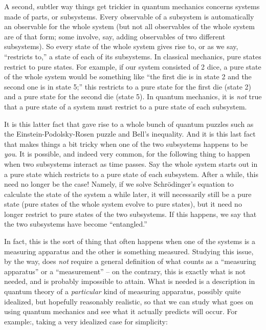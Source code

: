 \documentclass{article}
\begin{document}
A second, subtler way things get trickier in quantum mechanics concerns
systems made of parts, or subsystems. Every observable of a subsystem is
automatically an observable for the whole system (but not all
observables of the whole system are of that form; some involve, say,
adding observables of two different subsystems). So every state of the
whole system gives rise to, or as we say, ``restricts to,'' a state of
each of its subsystems. In classical mechanics, pure states restrict to
pure states. For example, if our system consisted of 2 dice, a pure
state of the whole system would be something like ``the first die is in
state 2 and the second one is in state 5;'' this restricts to a pure
state for the first die (state 2) and a pure state for the second die
(state 5). In quantum mechanics, it is \emph{not} true that a pure state
of a system must restrict to a pure state of each subsystem.

It is this latter fact that gave rise to a whole bunch of quantum
puzzles such as the Einstein-Podolsky-Rosen puzzle and Bell's
inequality. And it is this last fact that makes things a bit tricky when
one of the two subsystems happens to be \emph{you}. It is possible, and
indeed very common, for the following thing to happen when two
subsystems interact as time passes. Say the whole system starts out in a
pure state which restricts to a pure state of each subsystem. After a
while, this need no longer be the case! Namely, if we solve
Schr\"odinger's equation to calculate the state of the system a while
later, it will necessarily still be a pure state (pure states of the
whole system evolve to pure states), but it need no longer restrict to
pure states of the two subsystems. If this happens, we say that the two
subsystems have become ``entangled.''

In fact, this is the sort of thing that often happens when one of the
systems is a measuring apparatus and the other is something measured.
Studying this issue, by the way, does \emph{not} require a general
definition of what counts as a ``measuring apparatus'' or a
``measurement'' -- on the contrary, this is exactly what is not needed,
and is probably impossible to attain. What is needed is a description in
quantum theory of a \emph{particular} kind of measuring apparatus,
possibly quite idealized, but hopefully reasonably realistic, so that we
can study what goes on using quantum mechanics and see what it actually
predicts will occur. For example:, taking a very idealized case for
simplicity:
\end{document}
